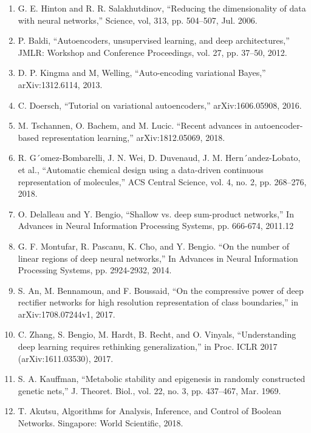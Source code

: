 \documentclass{article}
\begin{document}
\begin{enumerate}
	\item G. E. Hinton and R. R. Salakhutdinov, “Reducing the dimensionality of data with neural
	networks,” Science, vol, 313, pp. 504–507, Jul. 2006.

	\item P. Baldi, “Autoencoders, unsupervised learning, and deep architectures,” JMLR: Workshop
	and Conference Proceedings, vol. 27, pp. 37–50, 2012.

	\item D. P. Kingma and M, Welling, “Auto-encoding variational Bayes,” arXiv:1312.6114, 2013.

	\item C. Doersch, “Tutorial on variational autoencoders,” arXiv:1606.05908, 2016.

	\item M. Tschannen, O. Bachem, and M. Lucic. “Recent advances in autoencoder-based representation learning,” arXiv:1812.05069, 2018.

	\item R. G´omez-Bombarelli, J. N. Wei, D. Duvenaud, J. M. Hern´andez-Lobato, et al., “Automatic	chemical design using a data-driven continuous representation of molecules,” ACS Central
	Science, vol. 4, no. 2, pp. 268–276, 2018.

	\item O. Delalleau and Y. Bengio, “Shallow vs. deep sum-product networks,” In Advances in Neural
	Information Processing Systems, pp. 666-674, 2011.12

	\item G. F. Montufar, R. Pascanu, K. Cho, and Y. Bengio. “On the number of linear regions of
	deep neural networks,” In Advances in Neural Information Processing Systems, pp. 2924-2932, 2014.

	\item S. An, M. Bennamoun, and F. Boussaid, “On the compressive power of deep rectifier networks
	for high resolution representation of class boundaries,” in arXiv:1708.07244v1, 2017.

	\item C. Zhang, S. Bengio, M. Hardt, B. Recht, and O. Vinyals, “Understanding deep learning
	requires rethinking generalization,” in Proc. ICLR 2017 (arXiv:1611.03530), 2017.

	\item S. A. Kauffman, “Metabolic stability and epigenesis in randomly constructed genetic nets,” J.
	Theoret. Biol., vol. 22, no. 3, pp. 437–467, Mar. 1969.

	\item T. Akutsu, Algorithms for Analysis, Inference, and Control of Boolean Networks. Singapore: World Scientific, 2018.


\end{enumerate}
\end{document}
